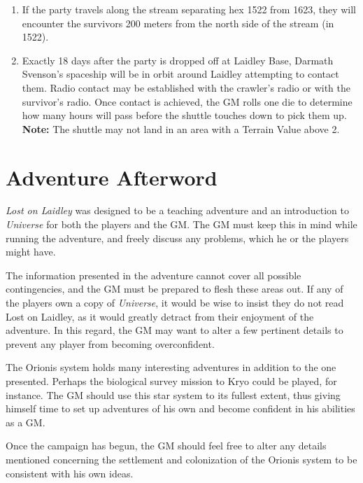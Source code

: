 \begin{enumerate}
\item If the party travels along the stream separating hex 1522 from
  1623, they will encounter the survivors 200 meters from the north
  side of the stream (in 1522).
  
\item Exactly 18 days after the party is dropped off at Laidley Base,
  Darmath Svenson's spaceship will be in orbit around Laidley
  attempting to contact them. Radio contact may be established with
  the crawler's radio or with the survivor's radio. Once contact is
  achieved, the GM rolls one die to determine how many hours will pass
  before the shuttle touches down to pick them up. \textbf{Note:} The
  shuttle may not land in an area with a Terrain Value above 2.
\end{enumerate}

\section{Adventure Afterword}
\label{sec:adventure-afterword}

\emph{Lost on Laidley} was designed to be a teaching adventure and an
introduction to \emph{Universe} for both the players and the GM. The
GM must keep this in mind while running the adventure, and freely
discuss any problems, which he or the players might have.

The information presented in the adventure cannot cover all possible
contingencies, and the GM must be prepared to flesh these areas out.
If any of the players own a copy of \emph{Universe}, it would be wise
to insist they do not read Lost on Laidley, as it would greatly
detract from their enjoyment of the adventure. In this regard, the GM
may want to alter a few pertinent details to prevent any player from
becoming overconfident.

The Orionis system holds many interesting adventures in addition to
the one presented. Perhaps the biological survey mission to Kryo could
be played, for instance. The GM should use this star system to its
fullest extent, thus giving himself time to set up adventures of his
own and become confident in his abilities as a GM.

Once the campaign has begun, the GM should feel free to alter any
details mentioned concerning the settlement and colonization of the
Orionis system to be consistent with his own ideas.


